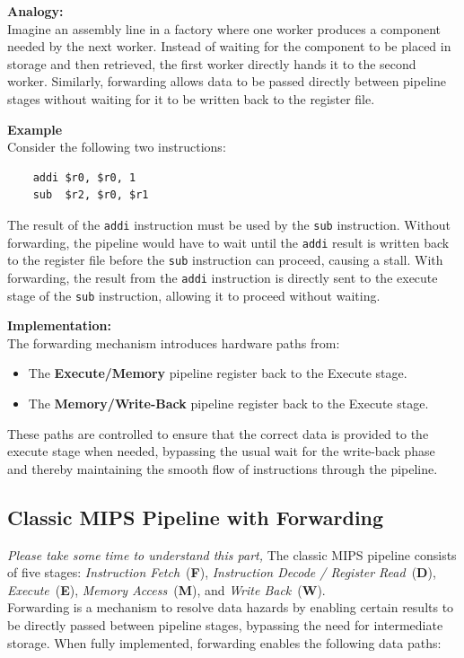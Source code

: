 \noindent \textbf{Analogy:} \\
Imagine an assembly line in a factory where one worker produces a component needed by the next worker. Instead of waiting for the component to be placed in storage and then retrieved, the first worker directly hands it to the second worker. Similarly, forwarding allows data to be passed directly between pipeline stages without waiting for it to be written back to the register file.

\noindent \textbf{Example} \\
Consider the following two instructions:
\begin{verbatim}
    addi $r0, $r0, 1
    sub  $r2, $r0, $r1
\end{verbatim}
The result of the \texttt{addi} instruction must be used by the \texttt{sub} instruction. Without forwarding, the pipeline would have to wait until the \texttt{addi} result is written back to the register file before the \texttt{sub} instruction can proceed, causing a stall. With forwarding, the result from the \texttt{addi} instruction is directly sent to the execute stage of the \texttt{sub} instruction, allowing it to proceed without waiting.

\noindent \textbf{Implementation:} \\
The forwarding mechanism introduces hardware paths from:
\begin{itemize}
    \item The \textbf{Execute/Memory} pipeline register back to the Execute stage.
    \item The \textbf{Memory/Write-Back} pipeline register back to the Execute stage.
\end{itemize}
These paths are controlled to ensure that the correct data is provided to the execute stage when needed, bypassing the usual wait for the write-back phase and thereby maintaining the smooth flow of instructions through the pipeline.
\newpage
\subsection{Classic MIPS Pipeline with Forwarding}
\textit{Please take some time to understand this part, }
The classic MIPS pipeline consists of five stages:
\emph{Instruction Fetch}~(\textbf{F}),
\emph{Instruction Decode / Register Read}~(\textbf{D}),
\emph{Execute}~(\textbf{E}),
\emph{Memory Access}~(\textbf{M}),
and
\emph{Write Back}~(\textbf{W}). \\
Forwarding is a mechanism to resolve data hazards by enabling certain results to be directly passed between pipeline stages, bypassing the need for intermediate storage. When fully implemented, forwarding enables the following data paths:

